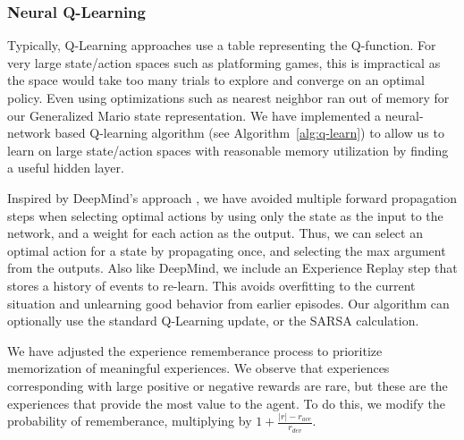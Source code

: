 \documentclass{article}
\begin{document}
\subsubsection{Neural Q-Learning}

Typically, Q-Learning approaches use a table representing the Q-function. For very large state/action spaces such as platforming games, this is impractical as the space would take too many trials to explore and converge on an optimal policy. Even using optimizations such as nearest neighbor ran out of memory for our Generalized Mario state representation. We have implemented a neural-network based Q-learning algorithm (see Algorithm~\ref{alg:q-learn}) to allow us to learn on large state/action spaces with reasonable memory utilization by finding a useful hidden layer. 

Inspired by DeepMind's approach \cite{Mnih13}, we have avoided multiple forward propagation steps when selecting optimal actions by using only the state as the input to the network, and a weight for each action as the output. Thus, we can select an optimal action for a state by propagating once, and selecting the max argument from the outputs. Also like DeepMind, we include an Experience Replay step that stores a history of events to re-learn. This avoids overfitting to the current situation and unlearning good behavior from earlier episodes. Our algorithm can optionally use the standard Q-Learning update, or the SARSA calculation.

We have adjusted the experience rememberance process to prioritize memorization of meaningful experiences. We observe that experiences corresponding with large positive or negative rewards are rare, but these are the experiences that provide the most value to the agent. To do this, we modify the probability of rememberance, multiplying by $1 + \frac{|r| - r_{ave}}{r_{dev}}$.
\end{document}
